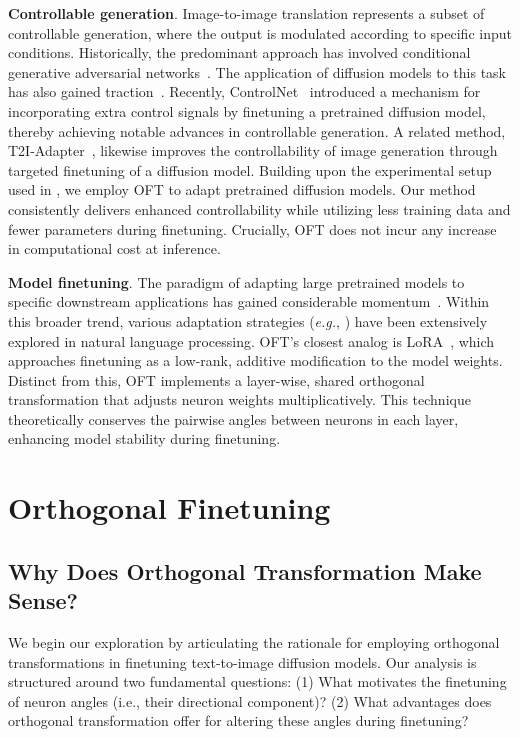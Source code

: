 \textbf{Controllable generation}. Image-to-image translation represents a subset of controllable generation, where the output is modulated according to specific input conditions. Historically, the predominant approach has involved conditional generative adversarial networks~\cite{isola2017image,zhu2017toward,wang2018high,park2019semantic,choi2018stargan}. The application of diffusion models to this task has also gained traction~\cite{saharia2022palette,voynov2022sketch,wang2022pretraining}. Recently, ControlNet~\cite{zhang2023adding} introduced a mechanism for incorporating extra control signals by finetuning a pretrained diffusion model, thereby achieving notable advances in controllable generation. A related method, T2I-Adapter~\cite{mou2023t2i}, likewise improves the controllability of image generation through targeted finetuning of a diffusion model. Building upon the experimental setup used in \cite{zhang2023adding,mou2023t2i}, we employ OFT to adapt pretrained diffusion models. Our method consistently delivers enhanced controllability while utilizing less training data and fewer parameters during finetuning. Crucially, OFT does not incur any increase in computational cost at inference.

\textbf{Model finetuning}. The paradigm of adapting large pretrained models to specific downstream applications has gained considerable momentum~\cite{devlin2018bert,brown2020language,he2022masked}. Within this broader trend, various adaptation strategies (\emph{e.g.}, \cite{hulora2022,houlsby2019parameter,pfeiffer2020adapterfusion}) have been extensively explored in natural language processing. OFT’s closest analog is LoRA~\cite{hulora2022}, which approaches finetuning as a low-rank, additive modification to the model weights. Distinct from this, OFT implements a layer-wise, shared orthogonal transformation that adjusts neuron weights multiplicatively. This technique theoretically conserves the pairwise angles between neurons in each layer, enhancing model stability during finetuning.

\section{Orthogonal Finetuning}

\subsection{Why Does Orthogonal Transformation Make Sense?}

We begin our exploration by articulating the rationale for employing orthogonal transformations in finetuning text-to-image diffusion models. Our analysis is structured around two fundamental questions: (1) What motivates the finetuning of neuron angles (i.e., their directional component)? (2) What advantages does orthogonal transformation offer for altering these angles during finetuning?


